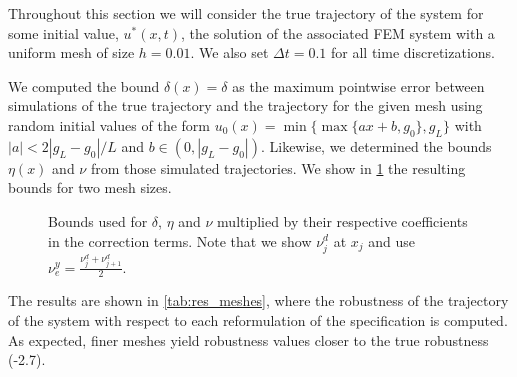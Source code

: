 \documentclass[letterpaper, 10 pt, conference]{ieeeconf/ieeeconf}
\begin{document}
Throughout this
section we will consider the true trajectory of the system for some initial
value, $u^*(x, t)$, the solution of the associated FEM system with a uniform mesh of
size $h = 0.01$. We also set $\Delta t = 0.1$ for all time discretizations.

We computed the bound $\delta(x) = \delta$ as the maximum pointwise
error between simulations of the true trajectory and the trajectory for the
given mesh using random initial values of the form $u_0(x) = \min\{\max\{a x +
b, g_0\}, g_L\}$ with $|a| < 2 |g_L - g_0| / L$ and $b \in (0, |g_L - g_0|)$.
Likewise, we determined the bounds $\eta(x)$ and $\nu$ from those simulated
trajectories. We show in \cref{fig:bounds} the resulting bounds for two mesh
sizes.

\begin{figure}[!t]
    \centering 
        \hfill
        \hfill
    \caption{Bounds used for $\delta$, $\eta$ and $\nu$ multiplied by their
    respective coefficients in the correction terms. Note that we show $\nu^d_j$ at
    $x_j$ and use $\nu_e^y = \frac{\nu^d_j + \nu^d_{j+1}}{2}$.}
    \label{fig:bounds}
\end{figure}

The results are shown in \cref{tab:res_meshes}, where the robustness of the
trajectory of the system with respect to each reformulation of the specification
is computed. As expected, finer meshes
yield robustness values closer to the true robustness (-2.7).
\end{document}
